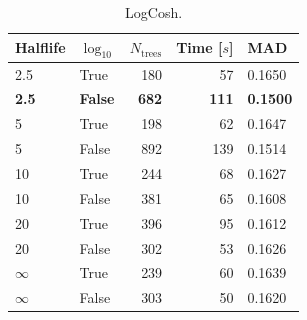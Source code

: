 \documentclass[a4paper, twoside, nobib]{tufte-book}
\begin{document}
  \begin{table}[]
  \begin{tabular}{@{}llrrl@{}}
    \toprule
  Halflife & $\log_{10}$ & $N_\mathrm{trees}$ & Time [$s$]   & MAD    \\ \midrule
  2.5 & True & 180 & 57  & 0.1650  \\
  \textbf{2.5} & \textbf{False} & \textbf{682} & \textbf{111} & \textbf{0.1500}   \\
  5   & True & 198 & 62  & 0.1647 \\
  5   & False & 892 & 139 & 0.1514 \\
  10  & True & 244 & 68  & 0.1627 \\
  10  & False & 381 & 65  & 0.1608 \\
  20  & True & 396 & 95  & 0.1612 \\
  20  & False & 302 & 53   & 0.1626 \\
  $\infty$   & True & 239 & 60  & 0.1639 \\
  $\infty$   & False & 303 & 50   & 0.1620  \\ \bottomrule
  \end{tabular}
  \caption{\label{tab:h:HPO_initial_LogCosh}LogCosh.}
  \end{table}
  
  
\end{document}
